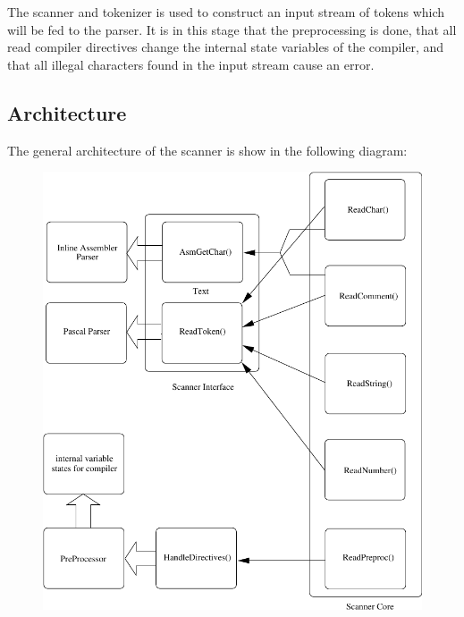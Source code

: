\documentclass [12pt]{article}
\begin{document}
The scanner and tokenizer is used to construct an input stream of tokens 
which will be fed to the parser. It is in this stage that the preprocessing 
is done, that all read compiler directives change the internal state 
variables of the compiler, and that all illegal characters found in the 
input stream cause an error.

\subsection{Architecture}
\label{subsec:architectureand}

The general architecture of the scanner is show in the following diagram:

\begin{figure}
\ifpdf
\includegraphics{arch2.pdf}
\else

\end{figure}
\end{document}
